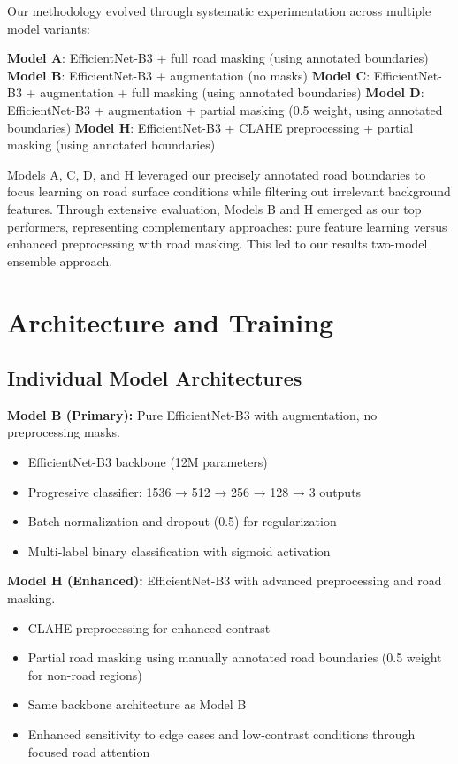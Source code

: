 \documentclass[12pt]{article}
\begin{document}
Our methodology evolved through systematic experimentation across multiple model variants:

\textbf{Model A}: EfficientNet-B3 + full road masking (using annotated boundaries)
\textbf{Model B}: EfficientNet-B3 + augmentation (no masks)  
\textbf{Model C}: EfficientNet-B3 + augmentation + full masking (using annotated boundaries)
\textbf{Model D}: EfficientNet-B3 + augmentation + partial masking (0.5 weight, using annotated boundaries)
\textbf{Model H}: EfficientNet-B3 + CLAHE preprocessing + partial masking (using annotated boundaries)

Models A, C, D, and H leveraged our precisely annotated road boundaries to focus learning on road surface conditions while filtering out irrelevant background features. Through extensive evaluation, Models B and H emerged as our top performers, representing complementary approaches: pure feature learning versus enhanced preprocessing with road masking. This led to our results two-model ensemble approach.

\section{Architecture and Training}

\subsection{Individual Model Architectures}

\textbf{Model B (Primary):} Pure EfficientNet-B3 with augmentation, no preprocessing masks.
\begin{itemize}[itemsep=1pt,parsep=0pt,topsep=2pt]
\item EfficientNet-B3 backbone (12M parameters)
\item Progressive classifier: 1536 → 512 → 256 → 128 → 3 outputs
\item Batch normalization and dropout (0.5) for regularization
\item Multi-label binary classification with sigmoid activation
\end{itemize}

\textbf{Model H (Enhanced):} EfficientNet-B3 with advanced preprocessing and road masking.
\begin{itemize}[itemsep=1pt,parsep=0pt,topsep=2pt]
\item CLAHE preprocessing for enhanced contrast
\item Partial road masking using manually annotated road boundaries (0.5 weight for non-road regions)
\item Same backbone architecture as Model B
\item Enhanced sensitivity to edge cases and low-contrast conditions through focused road attention
\end{itemize}
\end{document}
